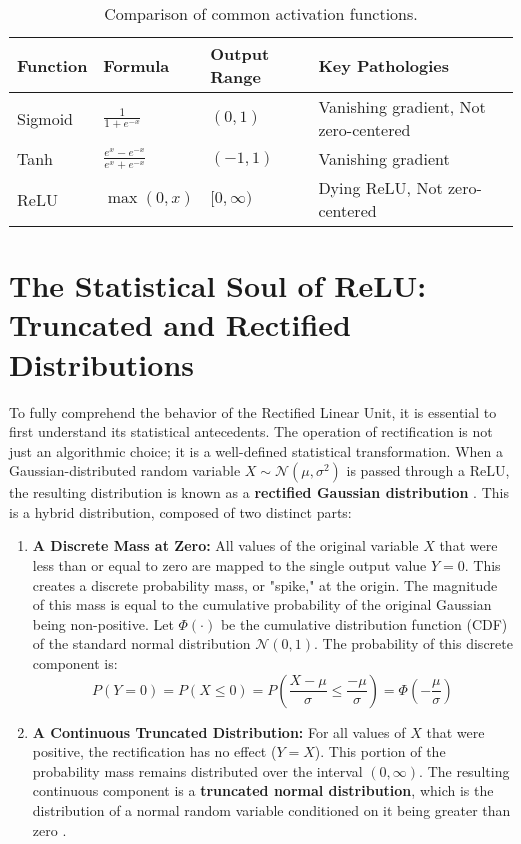\begin{table}[h!]
\centering
\caption{Comparison of common activation functions.}
\label{tab:activation_comparison}
\begin{tabular}{@{}llll@{}}
\toprule
\textbf{Function} & \textbf{Formula} & \textbf{Output Range} & \textbf{Key Pathologies} \\ \midrule
Sigmoid & $\frac{1}{1+e^{-x}}$ & $(0, 1)$ & Vanishing gradient, Not zero-centered \\
Tanh & $\frac{e^x - e^{-x}}{e^x + e^{-x}}$ & $(-1, 1)$ & Vanishing gradient \\
ReLU & $\max(0, x)$ & $[0, \infty)$ & Dying ReLU, Not zero-centered \\ \bottomrule
\end{tabular}
\end{table}

\section{The Statistical Soul of ReLU: Truncated and Rectified Distributions}
\label{sec:statistical_soul}

To fully comprehend the behavior of the Rectified Linear Unit, it is essential to first understand its statistical antecedents. The operation of rectification is not just an algorithmic choice; it is a well-defined statistical transformation. When a Gaussian-distributed random variable $X \sim \mathcal{N}(\mu, \sigma^2)$ is passed through a ReLU, the resulting distribution is known as a \textbf{rectified Gaussian distribution} \cite{Socci1998RectifiedGaussian}. This is a hybrid distribution, composed of two distinct parts:

\begin{enumerate}
    \item \textbf{A Discrete Mass at Zero:} All values of the original variable $X$ that were less than or equal to zero are mapped to the single output value $Y=0$. This creates a discrete probability mass, or "spike," at the origin. The magnitude of this mass is equal to the cumulative probability of the original Gaussian being non-positive. Let $\Phi(\cdot)$ be the cumulative distribution function (CDF) of the standard normal distribution $\mathcal{N}(0, 1)$. The probability of this discrete component is:
    \begin{equation}
    P(Y=0) = P(X \le 0) = P\left(\frac{X-\mu}{\sigma} \le \frac{-\mu}{\sigma}\right) = \Phi\left(-\frac{\mu}{\sigma}\right)
    \end{equation}

    \item \textbf{A Continuous Truncated Distribution:} For all values of $X$ that were positive, the rectification has no effect ($Y=X$). This portion of the probability mass remains distributed over the interval $(0, \infty)$. The resulting continuous component is a \textbf{truncated normal distribution}, which is the distribution of a normal random variable conditioned on it being greater than zero \cite{BarrSherrill1999TruncatedNormal}.
\end{enumerate}

